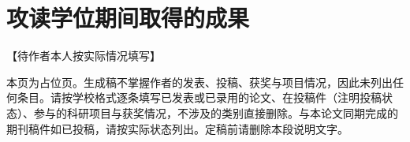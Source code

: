 \chapter*{攻读学位期间取得的成果}

\noindent【待作者本人按实际情况填写】

\noindent 本页为占位页。生成稿不掌握作者的发表、投稿、获奖与项目情况，因此未列出任何条目。请按学校格式逐条填写已发表或已录用的论文、在投稿件（注明投稿状态）、参与的科研项目与获奖情况，不涉及的类别直接删除。与本论文同期完成的期刊稿件如已投稿，请按实际状态列出。定稿前请删除本段说明文字。
